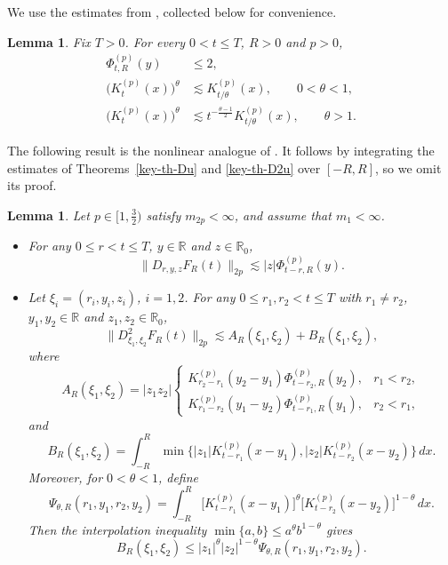 \documentclass[12pt]{article}
\newtheorem{lemma}[theorem]{Lemma}
\def\bR{\mathbb{R}}
\begin{document}
We use the estimates from \cite[Lemmas~4.3--4.5]{BLW26}, collected
below for convenience.
\begin{lemma}
Fix $T>0$. For every $0<t\le T$, $R>0$ and $p>0$,
\begin{align}
\label{Phi-bound}
\Phi_{t,R}^{(p)}(y)
&\le 2,
 \\
\label{K-power-bound}
\big(K_t^{(p)}(x)\big)^\theta
&\lesssim K_{t/\theta}^{(p)}(x),
\qquad 0<\theta<1,\\
\label{K-power-bound-large}
\big(K_t^{(p)}(x)\big)^\theta
&\lesssim t^{-\frac{\theta-1}{2}}K_{t/\theta}^{(p)}(x),
\qquad \theta>1.
\end{align}
\end{lemma}


The following result is the nonlinear analogue of
\cite[Lemma~4.2]{BLW26}. It follows by integrating the estimates of
Theorems~\ref{key-th-Du} and \ref{key-th-D2u} over $[-R,R]$, so we omit its proof.

\begin{lemma}
\label{lem:FR-derivative-nonlinear}
Let \(p\in[1,\frac32)\) satisfy \(m_{2p}<\infty\), and assume that $m_1<\infty$.

\begin{itemize}
\item[(i)] For any \(0\le r<t\le T\), \(y\in\bR\) and \(z\in\bR_0\),
\[
\|D_{r,y,z}F_R(t)\|_{2p}
\lesssim
|z|\Phi^{(p)}_{t-r,R}(y).
\]

\item[(ii)] Let \(\xi_i=(r_i,y_i,z_i)\), \(i=1,2\). For any
\(0\le r_1,r_2<t\le T\) with \(r_1\neq r_2\), \(y_1,y_2\in\bR\) and
\(z_1,z_2\in\bR_0\),
\[
\|D^2_{\xi_1,\xi_2}F_R(t)\|_{2p}
\lesssim
A_R(\xi_1,\xi_2)+B_R(\xi_1,\xi_2),
\]
where
\[
A_R(\xi_1,\xi_2)
=
|z_1z_2|
\begin{cases}
K^{(p)}_{r_2-r_1}(y_2-y_1)\Phi^{(p)}_{t-r_2,R}(y_2),
& r_1<r_2,\\[1mm]
K^{(p)}_{r_1-r_2}(y_1-y_2)\Phi^{(p)}_{t-r_1,R}(y_1),
& r_2<r_1,
\end{cases}
\]
and
\[
B_R(\xi_1,\xi_2)
=
\int_{-R}^{R}
\min\Big\{
|z_1|K^{(p)}_{t-r_1}(x-y_1),
|z_2|K^{(p)}_{t-r_2}(x-y_2)
\Big\}\,dx.
\]
Moreover, for \(0<\theta<1\), define
\[
\Psi_{\theta,R}(r_1,y_1,r_2,y_2)
=
\int_{-R}^{R}
\big[K^{(p)}_{t-r_1}(x-y_1)\big]^\theta
\big[K^{(p)}_{t-r_2}(x-y_2)\big]^{1-\theta}
\,dx.
\]
Then the interpolation inequality \(\min\{a,b\}\le a^\theta b^{1-\theta}\)
gives
\begin{equation}
\label{theta}
B_R(\xi_1,\xi_2)
\le
|z_1|^\theta |z_2|^{1-\theta}
\Psi_{\theta,R}(r_1,y_1,r_2,y_2).
\end{equation}
\end{itemize}
\end{lemma}
\end{document}
